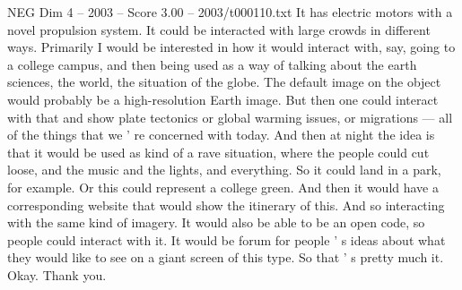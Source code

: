 \begin{textsample}{NEG Dim 4 – 2003 – Score 3.00 – 2003/t000110.txt}
It has electric motors with a novel propulsion system.
It could be interacted with large crowds in different ways.
Primarily I would be interested in how it would interact with, say, going to a college campus, and then being used as a way of talking about the earth sciences, the world, the situation of the globe.
The default image on the object would probably be a high-resolution Earth image.
But then one could interact with that and show plate tectonics or global warming issues, or migrations — all of the things that we ' re concerned with today.
And then at night the idea is that it would be used as kind of a rave situation, where the people could cut loose, and the music and the lights, and everything.
So it could land in a park, for example.
Or this could represent a college green.
And then it would have a corresponding website that would show the itinerary of this.
And so interacting with the same kind of imagery.
It would also be able to be an open code, so people could interact with it.
It would be forum for people ' s ideas about what they would like to see on a giant screen of this type.
So that ' s pretty much it.
Okay.
Thank you.

\end{textsample}
